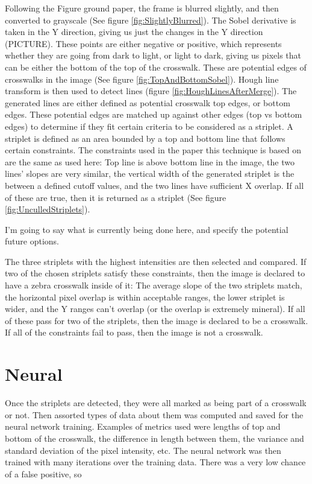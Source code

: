 \documentclass[12pt]{ucthesis}
\begin{document}
Following the Figure ground paper, the frame is blurred slightly, and then converted to grayscale (See figure \ref{fig:SlightlyBlurred}). The Sobel derivative is taken in the Y direction, giving us just the changes in the Y direction (PICTURE). These points are either negative or positive, which represents whether they are going from dark to light, or light to dark, giving us pixels that can be either the bottom of the top of the crosswalk. These are potential edges of crosswalks in the image (See figure \ref{fig:TopAndBottomSobel}). Hough line transform is then used to detect lines (figure \ref{fig:HoughLinesAfterMerge}). The generated lines are either defined as potential crosswalk top edges, or bottom edges. These potential edges are matched up against other edges (top vs bottom edges) to determine if they fit certain criteria to be considered as a striplet. A striplet is defined as an area bounded by a top and bottom line that follows certain constraints. The constraints used in the paper this technique is based on \cite{jamesm.coughlanhuiyingshen2006} are the same as used here: Top line is above bottom line in the image, the two lines' slopes are very similar, the vertical width of the generated striplet is the between a defined cutoff values, and the two lines have sufficient X overlap. If all of these are true, then it is returned as a striplet (See figure \ref{fig:UnculledStriplets}). 

I'm going to say what is currently being done here, and specify the potential future options. 

The three striplets with the highest intensities are then selected and compared. If two of the chosen striplets satisfy these constraints, then the image is declared to have a zebra crosswalk inside of it: The average slope of the two striplets match, the horizontal pixel overlap is within acceptable ranges, the lower striplet is wider, and the Y ranges can't overlap (or the overlap is extremely mineral). If all of these pass for two of the striplets, then the image is declared to be a crosswalk. If all of the constraints fail to pass, then the image is not a crosswalk. 


\section{Neural}

Once the striplets are detected, they were all marked as being part of a crosswalk or not. Then assorted types of data about them was computed and saved for the neural network training. Examples of metrics used were lengths of top and bottom of the crosswalk, the difference in length between them, the variance and standard deviation of the pixel intensity, etc. The neural network was then trained with many iterations over the training data. There was a very low chance of a false positive, so 
\end{document}
